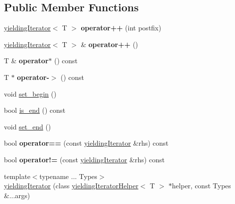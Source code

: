 \subsection*{Public Member Functions}
\begin{DoxyCompactItemize}
\item 
\mbox{\label{classjclib_1_1yieldingIterator_a731531f7cb83fcee5b1f05870bcac6af}} 
\hyperlink{classjclib_1_1yieldingIterator}{yielding\+Iterator}$<$ T $>$ {\bfseries operator++} (int postfix)
\item 
\mbox{\label{classjclib_1_1yieldingIterator_a8f9239c70f2a2b8551af9d70c022787a}} 
\hyperlink{classjclib_1_1yieldingIterator}{yielding\+Iterator}$<$ T $>$ \& {\bfseries operator++} ()
\item 
\mbox{\label{classjclib_1_1yieldingIterator_a7c3fe3bc9b66d16acdd02d7ad4307e2c}} 
T \& {\bfseries operator$\ast$} () const
\item 
\mbox{\label{classjclib_1_1yieldingIterator_aec060132555d5085559e4a3d719d0b08}} 
T $\ast$ {\bfseries operator-\/$>$} () const
\item 
void \hyperlink{classjclib_1_1yieldingIterator_af6051397c336c96df0a31895b2f125ab}{set\+\_\+begin} ()
\item 
bool \hyperlink{classjclib_1_1yieldingIterator_a2a80f65927659a1e913a9ed318113756}{is\+\_\+end} () const
\item 
void \hyperlink{classjclib_1_1yieldingIterator_ab824de9cf3585fe0e24d4efef9eb78d6}{set\+\_\+end} ()
\item 
\mbox{\label{classjclib_1_1yieldingIterator_a2cf750568debe31633245a9b2538cf3a}} 
bool {\bfseries operator==} (const \hyperlink{classjclib_1_1yieldingIterator}{yielding\+Iterator} \&rhs) const
\item 
\mbox{\label{classjclib_1_1yieldingIterator_afd059f348a648d504b063d8b328784ed}} 
bool {\bfseries operator!=} (const \hyperlink{classjclib_1_1yieldingIterator}{yielding\+Iterator} \&rhs) const
\item 
{\footnotesize template$<$typename ... Types$>$ }\\\hyperlink{classjclib_1_1yieldingIterator_a0dbcbd34a94bcce3144d2318fd7d8c09}{yielding\+Iterator} (class \hyperlink{classjclib_1_1yieldingIteratorHelper}{yielding\+Iterator\+Helper}$<$ T $>$ $\ast$helper, const Types \&...args)

\end{DoxyCompactItemize}
